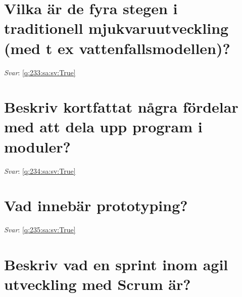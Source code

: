 \documentclass[a4paper,11pt,oneside]{book}
\begin{document}
\begin{sloppypar}
\section{Vilka \"ar de fyra stegen i traditionell mjukvaruutveckling (med t ex vattenfallsmodellen)?}

\label{q:233:sa:sv:False}

\vspace{2cm}

\noindent\makebox[\textwidth]{\hrulefill}

\vspace{1cm}

\textit{Svar}: \autoref{q:233:sa:sv:True}



\section{Beskriv kortfattat n\r{a}gra f\"ordelar med att dela upp program i moduler?}

\label{q:234:sa:sv:False}

\vspace{2cm}

\noindent\makebox[\textwidth]{\hrulefill}

\vspace{1cm}

\textit{Svar}: \autoref{q:234:sa:sv:True}



\section{Vad inneb\"ar prototyping?}

\label{q:235:sa:sv:False}

\vspace{2cm}

\noindent\makebox[\textwidth]{\hrulefill}

\vspace{1cm}

\textit{Svar}: \autoref{q:235:sa:sv:True}



\section{Beskriv vad en sprint inom agil utveckling med Scrum \"ar?}

\label{q:236:sa:sv:False}

\vspace{2cm}


\end{sloppypar}
\end{document}
